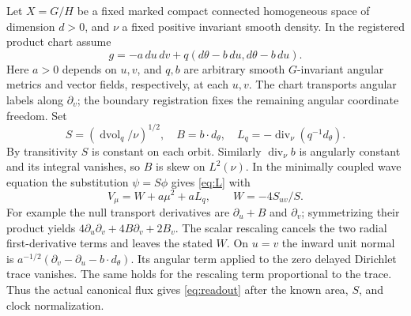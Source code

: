 \documentclass[11pt]{article}
\newcommand{\dvol}{\operatorname{dvol}}
\begin{document}
Let \(X=G/H\) be a fixed marked compact connected homogeneous space of dimension \(d>0\), and \(\nu\) a fixed positive invariant smooth density. In the registered product chart assume
\begin{equation}\label{eq:metric}
 g=-a\,du\,dv+q(d\theta-b\,du,d\theta-b\,du).
\end{equation}
Here \(a>0\) depends on \(u,v\), and \(q,b\) are arbitrary smooth \(G\)-invariant angular metrics and vector fields, respectively, at each \(u,v\). The chart transports angular labels along \(\partial_v\); the boundary registration fixes the remaining angular coordinate freedom. Set
\[
 S=(\dvol_q/\nu)^{1/2},\quad
 B=b\cdot d_\theta,\quad
 L_q=-\operatorname{div}_{\nu}(q^{-1}d_\theta).
\]
By transitivity \(S\) is constant on each orbit. Similarly \(\operatorname{div}_{\nu} b\) is angularly constant and its integral vanishes, so \(B\) is skew on \(L^2(\nu)\). In the minimally coupled wave equation the substitution \(\psi=S\phi\) gives \eqref{eq:L} with
\begin{equation}\label{eq:V}
 V_\mu=W+a\mu^2+a L_q,\qquad W=-4S_{uv}/S .
\end{equation}
For example the null transport derivatives are \(\partial_u+B\) and \(\partial_v\); symmetrizing their product yields \(4\partial_u\partial_v+4B\partial_v+2B_v\). The scalar rescaling cancels the two radial first-derivative terms and leaves the stated \(W\). On \(u=v\) the inward unit normal is \(a^{-1/2}(\partial_v-\partial_u-b\cdot d_\theta)\). Its angular term applied to the zero delayed Dirichlet trace vanishes. The same holds for the rescaling term proportional to the trace. Thus the actual canonical flux gives \eqref{eq:readout} after the known area, \(S\), and clock normalization.
\end{document}
